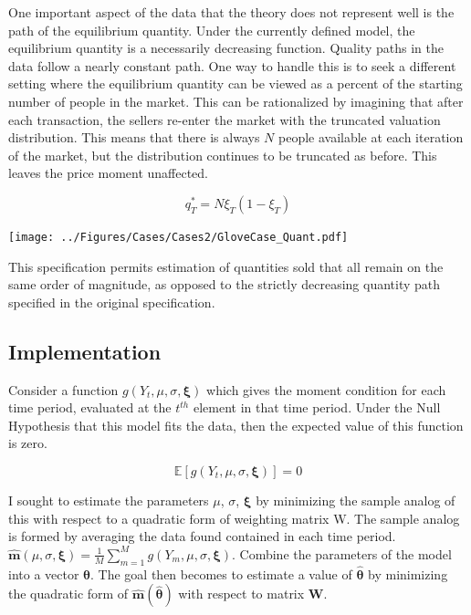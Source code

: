 \documentclass[12pt, letterpaper]{paper}
\begin{document}
One important aspect of the data that the theory does not represent
well is the path of the equilibrium quantity. Under the currently
defined model, the equilibrium quantity is a necessarily decreasing
function. Quality paths in the data follow a nearly constant
path. One way to handle this is to seek a different setting where the
equilibrium quantity can be viewed as a percent of the starting number
of people in the market. This can be rationalized by imagining that
after each transaction, the sellers re-enter the market with the
truncated valuation distribution. This means that there is always $N$
people available at each iteration of the market, but the distribution
continues to be truncated as before. This leaves the price moment unaffected.

\begin{equation*}
q_T^* = N \xi_T ( 1 - \xi_T )
\end{equation*}

\texttt{[image: ../Figures/Cases/Cases2/GloveCase\_Quant.pdf]}

This specification permits  estimation of quantities sold that all
remain on the same order of magnitude, as opposed to the strictly
decreasing quantity path specified in the original specification.


\subsection{Implementation}
\label{sec-4-2}
Consider a function $g(Y_t ,\mu,\sigma,\bm{\xi})$ which gives the moment condition for
each time period, evaluated at the $t^{th}$ element in that time
period. Under the Null Hypothesis that this model fits the data, then
the expected value of this function is zero.

\begin{equation*}
\mathbb{E}[ g( Y_t, \mu, \sigma, \bm{\xi}) ] = 0
\end{equation*}

I sought to estimate the parameters $\mu$, $\sigma$, $\bm{\xi}$ by minimizing the sample
analog of this with respect to a quadratic form of weighting matrix
W. The sample analog is formed by averaging the data found contained
in each time period.  $\bm{\hat{m}} ( \mu, \sigma, \bm{\xi}) = \frac{ 1 }{ M } \sum_{m=1}^M g(
Y_m, \mu, \sigma, \bm{\xi} )$. Combine the parameters of the model into a vector
$\bm{\theta}$. The goal then becomes to estimate a value of $\hat{\bm{\theta}}$ by
minimizing the quadratic form of $\bm{\hat{m}}( \bm{\hat{ \theta}} )$ with respect to
matrix $\bm{W}$.
\end{document}
